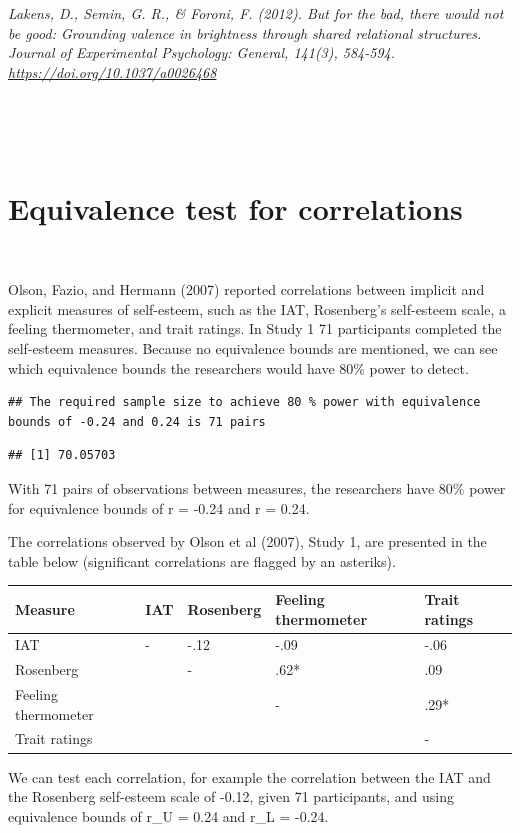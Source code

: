 \documentclass[english,man]{apa6}
\theoremstyle{definition}
\theoremstyle{definition}
\theoremstyle{definition}
\theoremstyle{remark}
\begin{document}
\emph{Lakens, D., Semin, G. R., \& Foroni, F. (2012). But for the bad,
there would not be good: Grounding valence in brightness through shared
relational structures. Journal of Experimental Psychology: General,
141(3), 584-594. \url{https://doi.org/10.1037/a0026468} }

~

~

\section{Equivalence test for
correlations}\label{equivalence-test-for-correlations}

~

Olson, Fazio, and Hermann (2007) reported correlations between implicit
and explicit measures of self-esteem, such as the IAT, Rosenberg's
self-esteem scale, a feeling thermometer, and trait ratings. In Study 1
71 participants completed the self-esteem measures. Because no
equivalence bounds are mentioned, we can see which equivalence bounds
the researchers would have 80\% power to detect.

\begin{verbatim}
## The required sample size to achieve 80 % power with equivalence bounds of -0.24 and 0.24 is 71 pairs
\end{verbatim}

\begin{verbatim}
## [1] 70.05703
\end{verbatim}

With 71 pairs of observations between measures, the researchers have
80\% power for equivalence bounds of r = -0.24 and r = 0.24.

The correlations observed by Olson et al (2007), Study 1, are presented
in the table below (significant correlations are flagged by an
asteriks).

\begin{longtable}[]{@{}lllll@{}}
\toprule
Measure & IAT & Rosenberg & Feeling thermometer & Trait
ratings\tabularnewline
\midrule
\endhead
IAT & - & -.12 & -.09 & -.06\tabularnewline
Rosenberg & & - & .62* & .09\tabularnewline
Feeling thermometer & & & - & .29*\tabularnewline
Trait ratings & & & & -\tabularnewline
\bottomrule
\end{longtable}

We can test each correlation, for example the correlation between the
IAT and the Rosenberg self-esteem scale of -0.12, given 71 participants,
and using equivalence bounds of r\_U = 0.24 and r\_L = -0.24.
\end{document}
